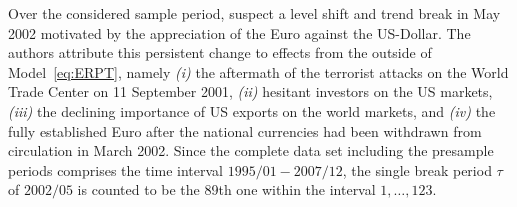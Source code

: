 Over the considered sample period, \citet{ArsovaOersal2016} suspect a level shift and trend break in May 2002 motivated by the appreciation of the Euro against the US-Dollar. The authors attribute this persistent change to effects from the outside of Model~\eqref{eq:ERPT}, namely \textit{(i)} the aftermath of the terrorist attacks on the World Trade Center on 11 September 2001, \textit{(ii)} hesitant investors on the US markets, \textit{(iii)} the declining importance of US exports on the world markets, and \textit{(iv)} the fully established Euro after the national currencies had been withdrawn from circulation in March 2002. Since the complete data set including the presample periods comprises the time interval $ 1995/01 - 2007/12 $, the single break period $ \tau $ of $ 2002/05 $ is counted to be the 89th one within the interval $ 1,\ldots,123$.

